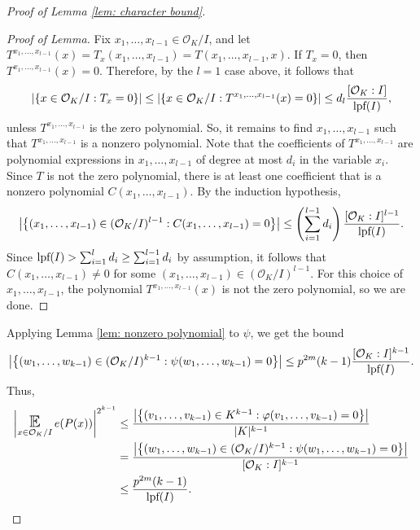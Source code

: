 \documentclass{amsart}
\theoremstyle{definition}
\numberwithin{equation}{section}
\newcommand{\mO}{\mathcal{O}}
\newcommand{\lpf}{\normalfont\text{lpf}}
\DeclareMathOperator*{\E}{\text{\Large $\mathbb{E}$}}
\begin{document}
\begin{proof}[Proof of Lemma \ref{lem: character bound}]
\begin{proof}[Proof of Lemma]
		Fix $x_1, \dots, x_{l-1} \in \mO_K/I$, and let $T^{x_1, \dots, x_{l-1}}(x) = T_x(x_1, \dots, x_{l-1}) = T(x_1, \dots, x_{l-1}, x)$.
		If $T_x = 0$, then $T^{x_1, \dots, x_{l-1}}(x) = 0$.
		Therefore, by the $l=1$ case above, it follows that
		\begin{equation*}
			\left| \{x \in \mO_K/I : T_x = 0\} \right|
			 \le \left| \{x \in \mO_K/I : T^{x_1, \dots, x_{l-1}}(x) = 0\} \right|
			 \le d_l \frac{[\mO_K:I]}{\lpf(I)},
		\end{equation*}
		unless $T^{x_1, \dots, x_{l-1}}$ is the zero polynomial.
		So, it remains to find $x_1, \dots, x_{l-1}$ such that $T^{x_1, \dots, x_{l-1}}$ is a nonzero polynomial.
		Note that the coefficients of $T^{x_1, \dots, x_{l-1}}$ are polynomial expressions in $x_1, \dots, x_{l-1}$ of degree at most $d_i$ in the variable $x_i$.
		Since $T$ is not the zero polynomial, there is at least one coefficient that is a nonzero polynomial $C(x_1, \dots, x_{l-1})$.
		By the induction hypothesis,
		\begin{equation*}
			\left| \left\{ (x_1, \dots, x_{l-1}) \in (\mO_K/I)^{l-1} : C(x_1, \dots, x_{l-1}) = 0 \right\} \right|
			 \le \left( \sum_{i=1}^{l-1}{d_i} \right) \frac{[\mO_K:I]^{l-1}}{\lpf(I)}.
		\end{equation*}
		Since $\lpf(I) > \sum_{i=1}^l{d_i} \ge \sum_{i=1}^{l-1}{d_i}$ by assumption, it follows that $C(x_1, \dots, x_{l-1}) \ne 0$ for some $(x_1, \dots, x_{l-1}) \in (\mO_K/I)^{l-1}$.
		For this choice of $x_1, \dots, x_{l-1}$, the polynomial $T^{x_1, \dots, x_{l-1}}(x)$ is not the zero polynomial, so we are done.
	\end{proof}
	
	Applying Lemma \ref{lem: nonzero polynomial} to $\psi$, we get the bound
	\begin{equation*}
		\left| \left\{ (w_1, \dots, w_{k-1}) \in (\mO_K/I)^{k-1} : \psi(w_1, \dots, w_{k-1}) = 0 \right\} \right|
		 \le p^{2m} (k-1) \frac{[\mO_K:I]^{k-1}}{\lpf(I)}.
	\end{equation*}
	Thus,
	\begin{align*}
		\left| \E_{x \in \mO_K/I}{e(P(x))} \right|^{2^{k-1}}
		 & \le \frac{\left| \left\{ (v_1, \dots, v_{k-1}) \in K^{k-1} : \varphi(v_1, \dots, v_{k-1}) = 0 \right\} \right|}{|K|^{k-1}} \\
		 & = \frac{\left| \left\{ (w_1, \dots, w_{k-1}) \in (\mO_K/I)^{k-1} : \psi(w_1, \dots, w_{k-1}) = 0 \right\} \right|}{[\mO_K:I]^{k-1}} \\
		 & \le \frac{p^{2m}(k-1)}{\lpf(I)}.
	\end{align*}
\end{proof}
\end{document}
